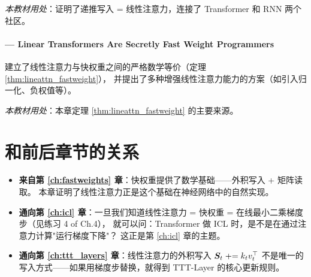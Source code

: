 \textit{本教材用处}：证明了递推写入 = 线性注意力，连接了 Transformer 和 RNN 两个社区。

\paragraph{\citet{schlag2021linear} — Linear Transformers Are Secretly Fast Weight Programmers}
建立了线性注意力与快权重之间的严格数学等价（定理 \ref{thm:lineattn_fastweight}），
并提出了多种增强线性注意力能力的方案（如引入归一化、负权值等）。

\textit{本教材用处}：本章定理 \ref{thm:lineattn_fastweight} 的主要来源。

\section{和前后章节的关系}
\label{sec:attn_bridges}

\begin{itemize}
  \item \textbf{来自第 \ref{ch:fastweights} 章}：快权重提供了数学基础——外积写入 + 矩阵读取。
        本章证明了线性注意力正是这个基础在神经网络中的自然实现。

  \item \textbf{通向第 \ref{ch:icl} 章}：一旦我们知道线性注意力 = 快权重 = 在线最小二乘梯度步（见练习 4 of Ch.4），
        就可以问：Transformer 做 ICL 时，是不是在通过注意力计算"运行梯度下降"？
        这正是第 \ref{ch:icl} 章的主题。

  \item \textbf{通向第 \ref{ch:ttt_layers} 章}：线性注意力的外积写入 $\boldsymbol{S}_t \mathrel{+}= k_t v_t^\top$
        不是唯一的写入方式——如果用梯度步替换，就得到 TTT-Layer 的核心更新规则。
\end{itemize}


